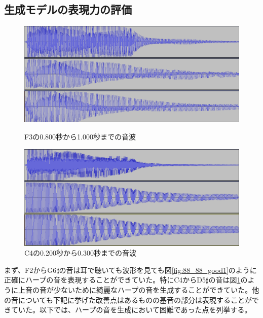 \subsection{生成モデルの表現力の評価}
\label{sec:expression}

\begin{figure}[t]
\begin{center}
\begin{minipage}{0.48\hsize}
\begin{center}
\includegraphics[width=0.9\hsize]{figure/88_88/f3.png}
\caption{F3の0.800秒から1.000秒までの音波}
\label{fig:88_88_good1}
\end{center}
\end{minipage}
\begin{minipage}{0.48\hsize}
\begin{center}
\includegraphics[width=0.9\hsize]{figure/88_88/c4.png}
\caption{C4の0.200秒から0.300秒までの音波}
\label{fig:88_88_good2}
\end{center}
\end{minipage}
\end{center}
\end{figure}


まず、F2からG6$\sharp$の音は耳で聴いても波形を見ても図\ref{fig:88_88_good1}のように正確にハープの音を表現することができていた。特にC4からD5$\sharp$の音は図\ref{fig:88_88_good2}のように上音の音が少ないために綺麗なハープの音を生成することができていた。他の音についても下記に挙げた改善点はあるものの基音の部分は表現することができていた。以下では、ハープの音を生成において困難であった点を列挙する。


